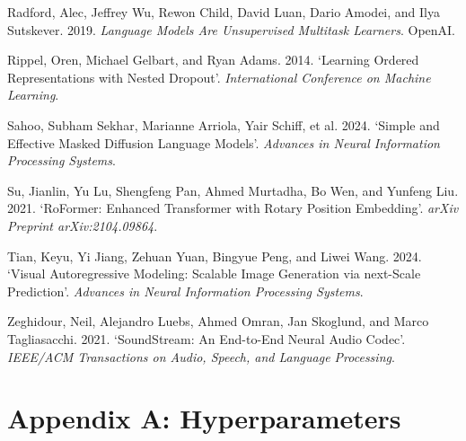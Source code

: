 \documentclass[
  british,
]{article}
\newlength{\cslhangindent}
\newenvironment{CSLReferences}[2] %
 {\begin{list}{}{%
  \setlength{\itemindent}{0pt}
  \setlength{\leftmargin}{0pt}
  \setlength{\parsep}{0pt}
  \ifodd #1
   \setlength{\leftmargin}{\cslhangindent}
   \setlength{\itemindent}{-1\cslhangindent}
  \fi
  \setlength{\itemsep}{#2\baselineskip}}}
 {\end{list}}
\begin{document}
\begin{CSLReferences}{1}{1}
Radford, Alec, Jeffrey Wu, Rewon Child, David Luan, Dario Amodei, and
Ilya Sutskever. 2019. \emph{Language Models Are Unsupervised Multitask
Learners}. OpenAI.

Rippel, Oren, Michael Gelbart, and Ryan Adams. 2014. {`Learning Ordered
Representations with Nested Dropout'}. \emph{International Conference on
Machine Learning}.

Sahoo, Subham Sekhar, Marianne Arriola, Yair Schiff, et al. 2024.
{`Simple and Effective Masked Diffusion Language Models'}.
\emph{Advances in Neural Information Processing Systems}.

Su, Jianlin, Yu Lu, Shengfeng Pan, Ahmed Murtadha, Bo Wen, and Yunfeng
Liu. 2021. {`{RoFormer}: Enhanced Transformer with Rotary Position
Embedding'}. \emph{arXiv Preprint arXiv:2104.09864}.

Tian, Keyu, Yi Jiang, Zehuan Yuan, Bingyue Peng, and Liwei Wang. 2024.
{`Visual Autoregressive Modeling: Scalable Image Generation via
next-Scale Prediction'}. \emph{Advances in Neural Information Processing
Systems}.

Zeghidour, Neil, Alejandro Luebs, Ahmed Omran, Jan Skoglund, and Marco
Tagliasacchi. 2021. {`SoundStream: An End-to-End Neural Audio Codec'}.
\emph{IEEE/ACM Transactions on Audio, Speech, and Language Processing}.

\end{CSLReferences}

\section*{Appendix A: Hyperparameters}\label{appendix-a-hyperparameters}
\end{document}

